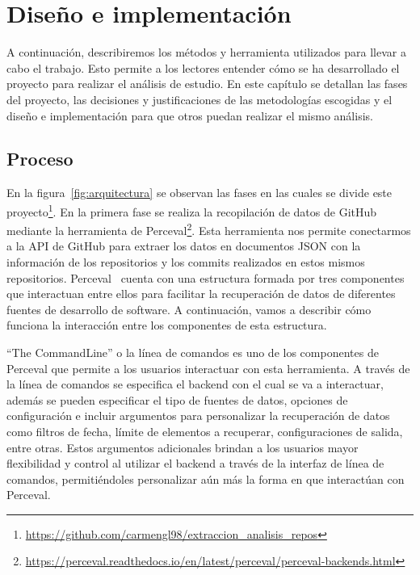 \documentclass[a4paper, 12pt]{book}
\begin{document}

\cleardoublepage
\chapter{Diseño e implementación}
\label{chap:diseño}

A continuación, describiremos los métodos y herramienta utilizados para llevar a cabo el trabajo. 
Esto permite a los lectores entender cómo se ha desarrollado el proyecto para realizar el análisis de estudio.
En este capítulo se detallan las fases del proyecto, las decisiones y justificaciones de las metodologías escogidas y el diseño e implementación para que otros puedan realizar el mismo análisis.

\section{Proceso} 
\label{sec:proceso}

En la figura~\ref{fig:arquitectura} se observan las fases en las cuales se divide este proyecto\footnote{\url{https://github.com/carmengl98/extraccion_analisis_repos}}. 
En la primera fase se realiza la recopilación de datos de GitHub mediante la herramienta de Perceval\footnote{\url{https://perceval.readthedocs.io/en/latest/perceval/perceval-backends.html}}. 
Esta herramienta nos permite conectarmos a la API de GitHub para extraer los datos en documentos JSON con la información de los repositorios y los commits realizados en estos mismos repositorios.
Perceval~\cite{duenas2018perceval} cuenta con una estructura formada por tres componentes que interactuan entre ellos para facilitar la recuperación de datos de diferentes fuentes de desarrollo de software.
A continuación, vamos a describir cómo funciona la interacción entre los componentes de esta estructura.


``The CommandLine'' o la línea de comandos es uno de los componentes de Perceval que permite a los usuarios interactuar con esta herramienta.
A través de la línea de comandos se especifica el backend con el cual se va a interactuar, además se pueden especificar el tipo de fuentes de datos, opciones de configuración e incluir argumentos para personalizar la recuperación de datos como filtros de fecha, límite de elementos a recuperar, configuraciones de salida, entre otras.
Estos argumentos adicionales brindan a los usuarios mayor flexibilidad y control al utilizar el backend a través de la interfaz de línea de comandos, permitiéndoles personalizar aún más la forma en que interactúan con Perceval.
\end{document}
